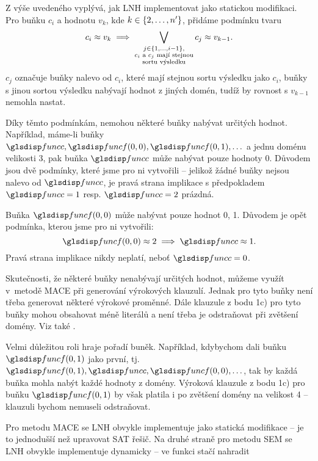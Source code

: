 Z výše uvedeného vyplývá, jak LNH implementovat jako statickou modifikaci.
Pro buňku $c_i$ a hodnotu
$v_k$, kde $k \in \{ 2 , \ldots, n' \}$, přidáme podmínku tvaru
\[
c_i \approx v_k \implies
  \bigvee_{\substack{
      j \in \{ 1 , \ldots, i-1 \}, \\
      \text{$c_i$ a $c_j$ mají stejnou} \\
      \text{sortu výsledku}}}
    c_j \approx v_{k-1}.
\]
$c_j$ označuje buňky nalevo od $c_i$, které mají stejnou sortu
výsledku jako $c_i$, buňky s jinou sortou výsledku
nabývají hodnot z jiných domén, tudíž by rovnost s $v_{k-1}$
nemohla nastat.

Díky těmto podmínkám, nemohou některé buňky nabývat určitých hodnot.
Například, máme-li buňky $\funcC, \func(0, 0), \func(0, 1), \ldots$
a jednu doménu velikosti 3, pak buňka $\funcC$ může nabývat pouze hodnoty
0. Důvodem jsou dvě podmínky, které jsme pro ni vytvořili --
jelikož žádné buňky nejsou nalevo od $\funcC$,
je pravá strana implikace s předpokladem
$\funcC = 1$ resp. $\funcC = 2$ prázdná.

Buňka $\func(0, 0)$ může nabývat pouze hodnot 0, 1. Důvodem
je opět podmínka, kterou jsme pro ni vytvořili:
\[
  \func(0, 0) \approx 2 \implies \funcC \approx 1.
\]
Pravá strana implikace nikdy neplatí, neboť $\funcC = 0$.

Skutečnosti, že některé buňky nenabývají určitých hodnot,
můžeme využít v~metodě MACE při generování výrokových klauzulí.
Jednak pro tyto buňky není třeba generovat některé výrokové proměnné.
Dále klauzule z bodu 1c) pro tyto buňky mohou obsahovat méně literálů
a není třeba je odstraňovat při zvětšení domény. Viz také
\cite{claessen03paradox}.

Velmi důležitou roli hraje pořadí buněk. Například, kdybychom dali
buňku $\func(0, 1)$ jako první, tj.
$\func(0, 1), \funcC, \func(0, 0), \ldots$,
tak by každá buňka mohla nabýt každé hodnoty z domény.
Výroková klauzule z bodu 1c) pro buňku $\func(0, 1)$
by však platila i po zvětšení domény na velikost 4 -- klauzuli
bychom nemuseli odstraňovat.

Pro metodu MACE se LNH obvykle implementuje jako statická modifikace
-- je to jednodušší než upravovat SAT řešič.
Na druhé straně pro metodu SEM se LNH obvykle
implementuje dynamicky -- ve funkci  stačí nahradit

\medskip
\begin{algorithmic}
    \State {}
  \EndFor
\end{algorithmic}
\medskip

